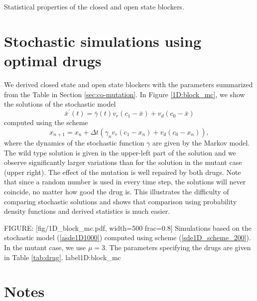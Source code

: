 {Statistical properties of the closed and open state blockers. %



\section[Stochastic simulations]{Stochastic simulations using optimal drugs}
\label{ffgg100}

We derived closed state and open state blockers with the parameters summarized from the Table in Section \ref{sec:co-mutation}. %
In Figure \ref{1D:block_mc}, we show the solutions of the stochastic model 
\begin{equation}
\bar{x}^{\prime}(t)=\bar{\gamma}(t)v_{r}(c_{1}-\bar{x})+v_{d}(c_{0}-\bar{x})
\label{asde1D1000}
\end{equation}
 computed 
using the scheme 
\begin{equation}
x_{n+1}=x_{n}+\Delta t\left( \gamma_{n}v_{r}(c_{1}-x_{n})+v_{d}(c_{0}
-x_{n})\right) \label{sde1D_scheme_200},
\end{equation}
where
 the dynamics of the stochastic function $\gamma$ are given by the Markov model. 
 The wild type solution is given in the upper-left part of the solution and we observe significantly larger 
 variations than for the solution in the mutant case (upper right). 
 The effect of the mutation is well repaired by both drugs. 
 Note that since a random number is used in every time step, the solutions will never coincide, no matter how good the drug is. This illustrates the difficulty of comparing stochastic solutions and shows that comparison using probability density functions and derived statistics is much easier.


FIGURE: [fig/1D_block_mc.pdf, width=500 frac=0.8] Simulations based on the stochastic model (\ref{asde1D1000}) computed 
using scheme (\ref{sde1D_scheme_200}). 
In the mutant case, we use $\mu=3$. The parameters specifying the drugs
are given in Table \ref{tab:drug}. 
 label{1D:block_mc}%


\section{Notes}

}
